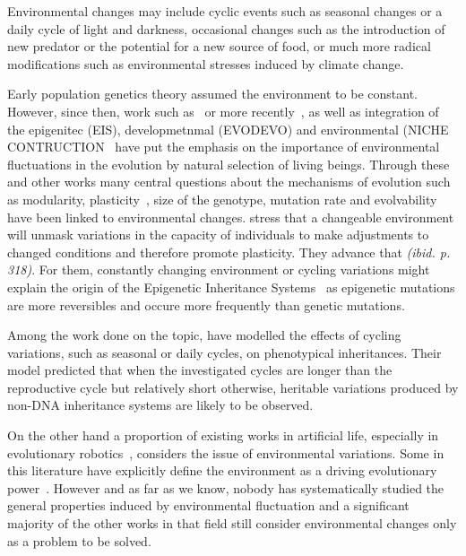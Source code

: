Environmental changes may include cyclic events such as seasonal changes or a daily cycle of light and darkness, occasional changes such as the introduction of new predator or the potential for a new source of food, or much more radical modifications such as environmental stresses induced by climate change.

Early population genetics theory assumed the environment to be constant. However, since then, work such as~\citep{levins1968evolution} or more recently~\citep{jablonka2014evolution}, as well as integration of the epigenitec (EIS), developmetnmal (EVODEVO) and environmental (NICHE CONTRUCTION~\cite{laland2016anintroductiontonicheconstructiontheory} have put the emphasis on the importance of environmental fluctuations in the evolution by natural selection of living beings. Through these and other works many central questions about the mechanisms of evolution such as modularity, plasticity~\citep{west2005developmental}, size of the genotype, mutation rate and evolvability have been linked to environmental changes. \cite{jablonka2014evolution} stress that a changeable environment will unmask variations in the capacity of individuals to make adjustments to changed conditions and therefore promote plasticity. They advance that \emph{(ibid. p. 318)}. For them, constantly changing environment or cycling variations might explain the origin of the Epigenetic Inheritance Systems~\cite{heard2014transgenerationalepigeneticinheritancemythsandmechanisms} as epigenetic mutations are more reversibles and occure more frequently than genetic mutations. 

Among the work done on the topic, \cite{lachmann1996inheritance} have modelled the effects of cycling variations, such as seasonal or daily cycles, on phenotypical inheritances. Their model predicted that when the investigated cycles are longer than the reproductive cycle but relatively short otherwise, heritable variations produced by non-DNA inheritance systems are likely to be observed. 

On the other hand a proportion of existing works in artificial life, especially in evolutionary robotics~\citep{floreano2000evolutionary}, considers the issue of environmental variations. Some in this literature have explicitly define the environment as a driving evolutionary power~\citep{bredeche2012environmentdrivenopenende}. However and as far as we know, nobody has systematically studied the general properties induced by environmental fluctuation and a significant majority of the other works in that field still consider environmental changes only as a problem to be solved.   %

